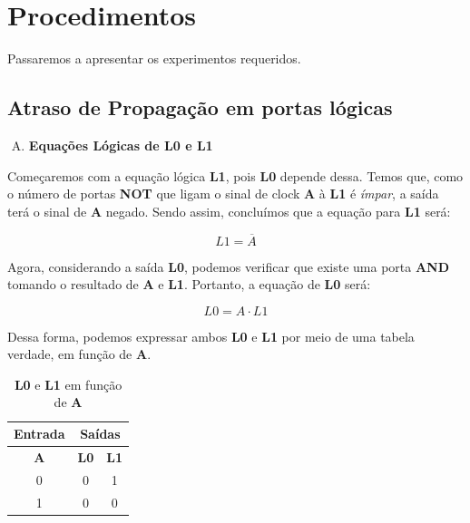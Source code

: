 \documentclass[12pt]{article}
\begin{document}
\section{Procedimentos}
\label{sec:Procedimentos}

Passaremos a apresentar os experimentos requeridos.

\subsection{Atraso de Propagação em portas lógicas}\label{sec:atraso_de_propagação}

\begin{enumerate}[A)]
\item \textbf{Equações Lógicas de L0 e L1}
\end{enumerate}

Começaremos com a equação lógica \textbf{L1}, pois \textbf{L0} depende dessa. Temos que, como
o número de portas \textbf{NOT} que ligam o sinal de clock \textbf{A} à
\textbf{L1} é \emph{ímpar}, a saída terá o sinal de \textbf{A} negado. Sendo
assim, concluímos que a equação para \textbf{L1} será:

\begin{equation}
L1 = \overline{A}
\end{equation}

Agora, considerando a saída \textbf{L0}, podemos verificar que existe uma porta
\textbf{AND} tomando o resultado de \textbf{A} e \textbf{L1}. Portanto, a equação de \textbf{L0} será:

\begin{equation}
L0 = A \cdot L1\label{eq:L0}
\end{equation}

Dessa forma, podemos expressar ambos \textbf{L0} e \textbf{L1} por meio de uma
tabela verdade, em função de \textbf{A}.

\begin{table}[H]
    \centering
    \caption{\textbf{L0} e \textbf{L1} em função de \textbf{A}}
    \begin{tabular}{|c|c|c|}\hline
        \multicolumn{1}{|c|}{Entrada} & \multicolumn{2}{|c|}{Saídas} \\\hline
        \textbf{A} & \textbf{L0} & \textbf{L1} \\\hline
        0 & 0 & 1 \\\hline
        1 & 0 & 0 \\\hline
    \end{tabular}\label{tab:atraso_de_propagação:L0_L1}
\end{table}
\end{document}
